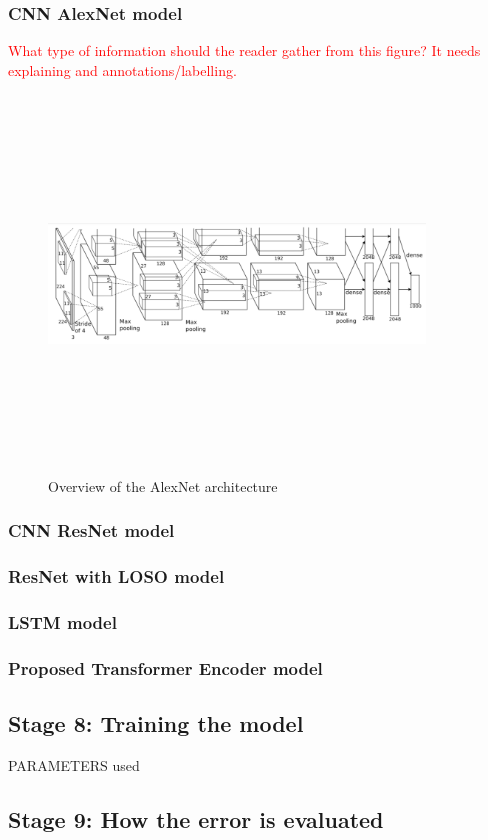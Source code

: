 \subsubsection{CNN AlexNet model}

\textcolor{red}{What type of information should the reader gather from this figure? It needs explaining and annotations/labelling.}

\begin{figure}[H]
    \centering
    \includegraphics[width=10cm,height=10cm,keepaspectratio]{Implementation/alexnetArch.png}
    \caption{Overview of the AlexNet architecture}
    \label{alexnetArch}
\end{figure}

\subsubsection{CNN ResNet model}

\subsubsection{ResNet with LOSO model}

\subsubsection{LSTM model}

\subsubsection{Proposed Transformer Encoder model}


\subsection{Stage 8: Training the model}
PARAMETERS used

\subsection{Stage 9: How the error is evaluated}